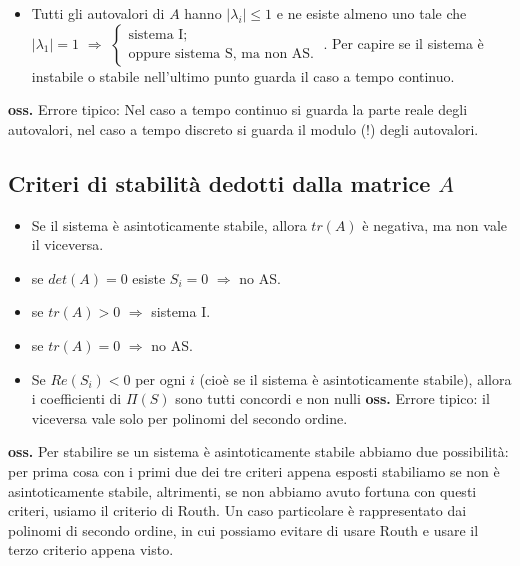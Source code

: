 \begin{landscape}
\begin{multicols*}{3}
\begin{itemize}
        \item Tutti gli autovalori di $A$ hanno $|\lambda_i| \leq 1$ e ne esiste almeno uno tale che $|\lambda_1| = 1$ $\Longrightarrow$ $\begin{cases}
            \text{sistema I;}\;\\
            \text{oppure sistema S, ma non AS.}\;
        \end{cases}$. \newline
        Per capire se il sistema è instabile o stabile nell'ultimo punto guarda il caso a tempo continuo.
    \end{itemize}
    \textbf{oss.} Errore tipico: Nel caso a tempo continuo si guarda la parte reale degli autovalori, nel caso a tempo discreto si guarda il modulo (!) degli autovalori.
    \subsection{Criteri di stabilità dedotti dalla matrice $A$}
    \begin{itemize}
        \item Se il sistema è asintoticamente stabile, allora $tr(A)$ è negativa, ma non vale il viceversa.
        \item se $det(A) = 0$ esiste $S_i = 0$ $\Longrightarrow$ no AS.
        \item se $tr(A) >0$ $\Longrightarrow$ sistema I.
        \item se $tr(A) = 0$ $\Longrightarrow$ no AS.
        \item Se $Re(S_i)<0$ per ogni $i$ (cioè se il sistema è asintoticamente stabile), allora i coefficienti di $\Pi(S)$ sono tutti concordi e non nulli \newline
        \textbf{oss.} Errore tipico: il viceversa vale solo per polinomi del secondo ordine.
    \end{itemize}
    \textbf{oss.} Per stabilire se un sistema è asintoticamente stabile abbiamo due possibilità: per prima cosa con i primi due dei tre criteri appena esposti stabiliamo se non è asintoticamente stabile, altrimenti, se non abbiamo avuto fortuna con questi criteri, usiamo il criterio di Routh. Un caso particolare è rappresentato dai polinomi di secondo ordine, in cui possiamo evitare di usare Routh e usare il terzo criterio appena visto.

\end{multicols*}
\end{landscape}
